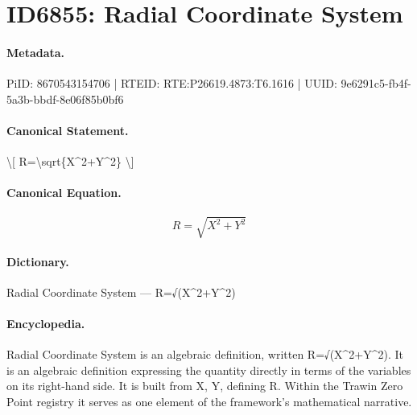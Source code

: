 \section*{ID6855: Radial Coordinate System}
\paragraph{Metadata.}
PiID: 8670543154706 | RTEID: RTE:P26619.4873:T6.1616 | UUID: 9e6291c5-fb4f-5a3b-bbdf-8e06f85b0bf6

\paragraph{Canonical Statement.}
\textbackslash{}[ R=\textbackslash{}sqrt\{X\textasciicircum{}2+Y\textasciicircum{}2\} \textbackslash{}]

\paragraph{Canonical Equation.}
\[
R=\sqrt{X^2+Y^2}
\]

\paragraph{Dictionary.}
Radial Coordinate System — R=√(X\textasciicircum{}2+Y\textasciicircum{}2)

\paragraph{Encyclopedia.}
Radial Coordinate System is an algebraic definition, written R=√(X\textasciicircum{}2+Y\textasciicircum{}2). It is an algebraic definition expressing the quantity directly in terms of the variables on its right-hand side. It is built from X, Y, defining R. Within the Trawin Zero Point registry it serves as one element of the framework's mathematical narrative.
